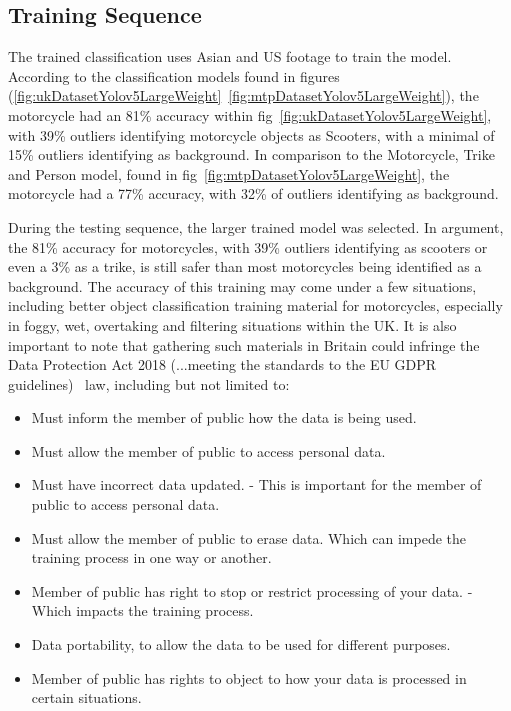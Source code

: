 \documentclass[conference]{IEEEtran}
\begin{document}
	\subsection{Training Sequence}
	The trained classification uses Asian and US footage to train the model. According to the classification models found in figures (\ref{fig:ukDatasetYolov5LargeWeight}~\ref{fig:mtpDatasetYolov5LargeWeight}), the motorcycle had an 81\% accuracy within fig~\ref{fig:ukDatasetYolov5LargeWeight}, with 39\% outliers identifying motorcycle objects as Scooters, with a minimal of 15\% outliers identifying as background. In comparison to the Motorcycle, Trike and Person model, found in fig~\ref{fig:mtpDatasetYolov5LargeWeight}, the motorcycle had a 77\% accuracy, with 32\% of outliers identifying as background.

	During the testing sequence, the larger trained model was selected. In argument, the 81\% accuracy for motorcycles, with 39\% outliers identifying as scooters or even a 3\% as a trike, is still safer than most motorcycles being identified as a background. The accuracy of this training may come under a few situations, including better object classification training material for motorcycles, especially in foggy, wet, overtaking and filtering situations within the UK. It is also important to note that gathering such materials in Britain could infringe the Data Protection Act 2018 (...meeting the standards to the EU GDPR guidelines)~\cite{govuk_data_2018} law, including but not limited to:

		\begin{itemize}
			\item Must inform the member of public how the data is being used.
			\item Must allow the member of public to access personal data.
			\item Must have incorrect data updated. - This is important for the member of public to access personal data.
			\item Must allow the member of public to erase data. Which can impede the training process in one way or another.
			\item Member of public has right to stop or restrict processing of your data. - Which impacts the training process.
			\item Data portability, to allow the data to be used for different purposes.
			\item Member of public has rights to object to how your data is processed in certain situations.
		\end{itemize}
\end{document}
